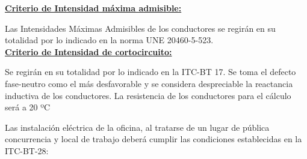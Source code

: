 \underline{\bfseries Criterio de Intensidad máxima admisible:}\

Las Intensidades Máximas Admisibles de los conductores se regirán en su totalidad por lo indicado en la norma UNE 20460-5-523.\\

\underline{\bfseries Criterio de Intensidad de cortocircuito:}\

Se regirán en su totalidad por lo indicado en la ITC-BT 17. Se toma el defecto fase-neutro como el más desfavorable y se considera despreciable la reactancia inductiva de los conductores. La resistencia de los conductores para el cálculo será a 20 ºC\\
\pagebreak

Las instalación eléctrica de la oficina, al tratarse de un lugar de pública concurrencia y local de trabajo deberá cumplir las condiciones establecidas en la ITC-BT-28: \\

